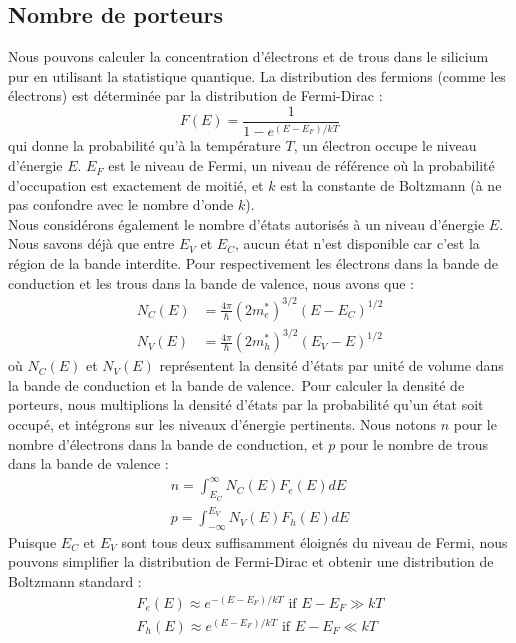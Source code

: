 \subsection{Nombre de porteurs}
Nous pouvons calculer la concentration d'électrons et de trous dans le silicium pur en utilisant la statistique quantique. La distribution des fermions (comme les électrons) est déterminée par la distribution de Fermi-Dirac :
$$
F(E) = \frac{1}{1-e^{(E-E_F)/kT}}
$$
qui donne la probabilité qu'à la température $T$, un électron occupe le niveau d'énergie $E$. $E_F$ est le niveau de Fermi, un niveau de référence où la probabilité d'occupation est exactement de moitié, et $k$ est la constante de Boltzmann (à ne pas confondre avec le nombre d'onde $k$).\\
Nous considérons également le nombre d'états autorisés à un niveau d'énergie $E$. Nous savons déjà que entre $E_V$ et $E_C$, aucun état n'est disponible car c'est la région de la bande interdite. Pour respectivement les électrons dans la bande de conduction et les trous dans la bande de valence, nous avons que :
\begin{equation} 
\begin{split}
N_C(E)  &= \frac{4 \pi}{\hbar} (2 m_e^*)^{3/2} (E - E_C)^{1/2} \\
N_V(E)  &= \frac{4 \pi}{\hbar} (2 m_h^*)^{3/2} (E_V - E)^{1/2}
\end{split}
\end{equation}
où $N_C(E)$ et $N_V(E)$ représentent la densité d'états par unité de volume dans la bande de conduction et la bande de valence.\
Pour calculer la densité de porteurs, nous multiplions la densité d'états par la probabilité qu'un état soit occupé, et intégrons sur les niveaux d'énergie pertinents. Nous notons $n$ pour le nombre d'électrons dans la bande de conduction, et $p$ pour le nombre de trous dans la bande de valence :
\begin{equation}
	\begin{split}
		n = \int_{E_C}^{\infty} N_C(E) F_e(E) dE\\
		p = \int_{-\infty}^{E_V} N_V(E) F_h(E) dE
		\label{eq:carrier_density}
	\end{split}
\end{equation}
Puisque $E_C$ et $E_V$ sont tous deux suffisamment éloignés du niveau de Fermi, nous pouvons simplifier la distribution de Fermi-Dirac et obtenir une distribution de Boltzmann standard :
\begin{equation} 
\begin{split}
F_e(E) \approx e^{-(E-E_F)/kT}\text{ if }E-E_F \gg kT \\
F_h(E) \approx e^{(E-E_F)/kT}\text{ if }E-E_F \ll kT 
\label{eq:boltzmann_simple}
\end{split}
\end{equation}
